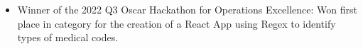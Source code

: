 \documentclass[a4paper]{article}
\begin{document}
\begin{itemize}[leftmargin=10pt,align=left]
     \item Winner of the 2022 Q3 Oscar Hackathon for Operations Excellence: Won first place in category for the creation of a React App using Regex to identify types of medical codes.
\end{itemize}
\end{document}
